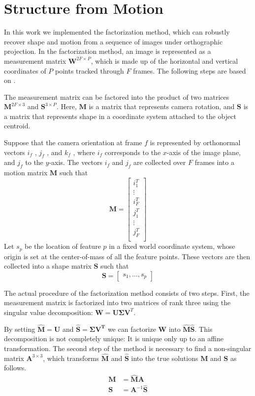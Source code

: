 \documentclass[]{IEEEtran}
\begin{document}

\section{Structure from Motion}
In this work we implemented the factorization method, which can robustly recover shape and motion from a sequence of images under orthographic projection. In the factorization method, an image is represented as a measurement matrix $\bm{W}^{2F \times P}$, which is made up of the horizontal and vertical coordinates of $P$ points tracked through $F$ frames. The following steps are based on \cite{morita}.

The measurement matrix can be factored into the product of two matrices $\bm{M}^{2F \times 3}$ and $\bm{S}^{3 \times P}$. Here, $\bm{M}$ is a matrix that represents camera rotation, and $\bm{S}$ is a matrix that represents shape in a coordinate system attached to the object centroid.

Suppose that the camera orientation at frame $f$ is represented by orthonormal vectors $i_f$ , $j_f$ , and $k_f$ , where $i_f$ corresponds to the $x$-axis of the image plane, and $j_f$ to the $y$-axis. The vectors $i_f$ and $j_f$ are collected over $F$ frames into a motion matrix $\bm{M}$ such that
\[
\bm{M} =
\begin{bmatrix}
    i_{1}^T \\
    \vdots \\
    i_{F}^T \\
    j_{1}^T \\
    \vdots \\
    j_{F}^T \\
\end{bmatrix}
\]
Let $s_p$ be the location of feature $p$ in a fixed world coordinate system, whose origin is set at the center-of-mass of all the feature points. These vectors are then collected into a shape matrix $\bm{S}$ such that
\[
\bm{S} =
\begin{bmatrix}
    s_1, \dots, s_p
\end{bmatrix}
\]

The actual procedure of the factorization method consists of two steps. First, the measurement matrix is factorized into two matrices of rank three using the singular value decomposition: $\bm{W} = \bm{U}\bm{\Sigma}\bm{V}^T$.

By setting $\hat{\bm{M}} = \bm{U}$ and $\hat{\bm{S}} = \bm{\Sigma V^T}$ we can factorize $\bm{W}$ into $\hat{\bm{M}}\hat{\bm{S}}$. This decomposition is not completely unique: It is unique only up to an affine transformation. The second step of the method is necessary to find a non-singular matrix $\bm{A}^{3 \times 3}$, which transforms $\hat{\bm{M}}$ and $\hat{\bm{S}}$ into the true solutions $\bm{M}$ and $\bm{S}$ as follows.
\begin{align*}
    \bm{M} &= \hat{\bm{M}}\bm{A}\\
    \bm{S} &= \bm{A}^{-1}\hat{\bm{S}}
\end{align*}
\end{document}

